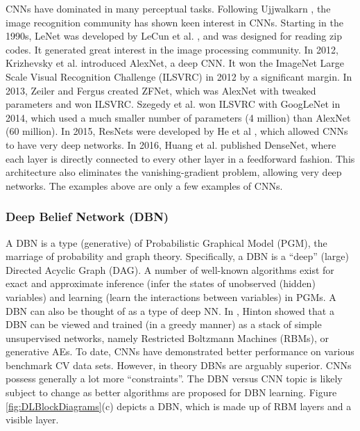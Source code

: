 \documentclass[12pt]{spieman}
\begin{document}
\begin{spacing}{1}
CNNs have dominated in many perceptual tasks. Following Ujjwalkarn \cite{Ujjwalkarn2016Intuitive} , the image recognition community has shown keen interest in CNNs. Starting in the 1990s, LeNet was developed by LeCun et al. \cite{lecun1998gradient} , and was designed for reading zip codes. It generated great interest in the image processing community. In 2012, Krizhevsky et al. \cite{krizhevsky2012imagenet} introduced AlexNet, a deep CNN. It won the ImageNet Large Scale Visual Recognition Challenge (ILSVRC) in 2012 by a significant margin. In 2013, Zeiler and Fergus \cite{zeiler2014visualizing} created ZFNet, which was AlexNet with tweaked parameters and won ILSVRC. Szegedy et al. \cite{szegedy2015going} won ILSVRC with GoogLeNet in 2014, which used a much smaller number of parameters (4 million) than AlexNet (60 million). In 2015, ResNets were developed by He et al \cite{he2016deep} , which allowed CNNs to have very deep networks. In 2016, Huang et al. \cite{huang2016densely} published DenseNet, where each layer is directly connected to every other layer in a feedforward fashion. This architecture also eliminates the vanishing-gradient problem, allowing very deep networks. The examples above are only a few examples of CNNs.

\subsubsection{Deep Belief Network (DBN)}
A DBN is a type (generative) of Probabilistic Graphical Model (PGM), the marriage of probability and graph theory. Specifically, a DBN is a ``deep'' (large) Directed Acyclic Graph (DAG). A number of well-known algorithms exist for exact and approximate inference (infer the states of unobserved (hidden) variables) and learning (learn the interactions between variables) in PGMs. A DBN can also be thought of as a type of deep NN. In \cite{HinSal06} , Hinton showed that a DBN can be viewed and trained (in a greedy manner) as a stack of simple unsupervised networks, namely Restricted Boltzmann Machines (RBMs), or generative AEs. To date, CNNs have demonstrated better performance on various benchmark CV data sets. However, in theory DBNs are arguably superior. CNNs possess generally a lot more ``constraints''. The DBN versus CNN topic is likely subject to change as better algorithms are proposed for DBN learning. Figure \ref{fig:DLBlockDiagrams}(c) depicts a DBN, which is made up of RBM layers and a visible layer.


\end{spacing}
\end{document}
